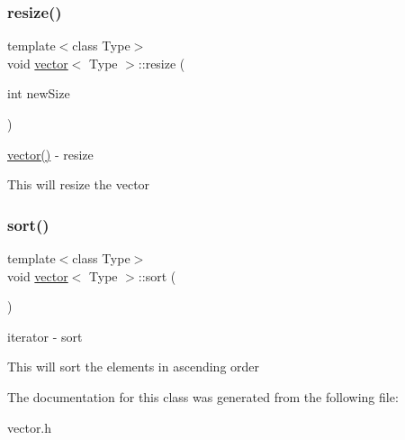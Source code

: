 \subsubsection{\texorpdfstring{resize()}{resize()}}
{\footnotesize\ttfamily template$<$class Type$>$ \\
void \hyperlink{classvector}{vector}$<$ Type $>$\+::resize (\begin{DoxyParamCaption}\item[{int}]{new\+Size }\end{DoxyParamCaption})\hspace{0.3cm}{\ttfamily [inline]}}



\hyperlink{classvector_ab8d8ebaa9b91a05bb7a94371cb84c042}{vector()} -\/ resize 

This will resize the vector \hypertarget{classvector_a07b7c89f4914f1558409e81ca0fe4e72}{}\label{classvector_a07b7c89f4914f1558409e81ca0fe4e72} 
\subsubsection{\texorpdfstring{sort()}{sort()}}
{\footnotesize\ttfamily template$<$class Type$>$ \\
void \hyperlink{classvector}{vector}$<$ Type $>$\+::sort (\begin{DoxyParamCaption}{ }\end{DoxyParamCaption})\hspace{0.3cm}{\ttfamily [inline]}}



iterator -\/ sort 

This will sort the elements in ascending order 

The documentation for this class was generated from the following file\+:\begin{DoxyCompactItemize}
\item 
vector.\+h\end{DoxyCompactItemize}
